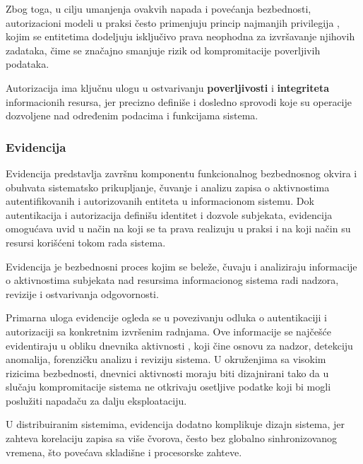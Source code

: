 Zbog toga, u cilju umanjenja ovakvih napada i povećanja bezbednosti, autorizacioni modeli u praksi često primenjuju princip najmanjih privilegija \cite{ceesay2010authentication}, kojim se entitetima dodeljuju isključivo prava neophodna za izvršavanje njihovih zadataka, čime se značajno smanjuje rizik od kompromitacije poverljivih podataka.

Autorizacija ima ključnu ulogu u ostvarivanju \textbf{poverljivosti} i \textbf{integriteta} informacionih resursa, jer precizno definiše i dosledno sprovodi koje su operacije dozvoljene nad određenim podacima i funkcijama sistema.

\subsubsection{Evidencija}
Evidencija predstavlja završnu komponentu funkcionalnog bezbednosnog okvira i obuhvata sistematsko prikupljanje, čuvanje i analizu zapisa o aktivnostima autentifikovanih i autorizovanih entiteta u informacionom sistemu. Dok autentikacija i autorizacija definišu identitet i dozvole subjekata, evidencija omogućava uvid u način na koji se ta prava realizuju u praksi i na koji način su resursi korišćeni tokom rada sistema.

\begin{definicija}
Evidencija je bezbednosni proces kojim se beleže, čuvaju i analiziraju informacije o aktivnostima subjekata nad resursima informacionog sistema radi nadzora, revizije i ostvarivanja odgovornosti.
\end{definicija}

Primarna uloga evidencije ogleda se u povezivanju odluka o autentikaciji i autorizaciji sa konkretnim izvršenim radnjama. Ove informacije se najčešće evidentiraju u obliku dnevnika aktivnosti , koji čine osnovu za nadzor, detekciju anomalija, forenzičku analizu i reviziju sistema. U okruženjima sa visokim rizicima bezbednosti, dnevnici aktivnosti moraju biti dizajnirani tako da u slučaju kompromitacije sistema ne otkrivaju osetljive podatke koji bi mogli poslužiti napadaču za dalju eksploataciju.

U distribuiranim sistemima, evidencija dodatno komplikuje dizajn sistema, jer zahteva korelaciju zapisa sa više čvorova, često bez globalno sinhronizovanog vremena, što povećava skladišne i procesorske zahteve.


